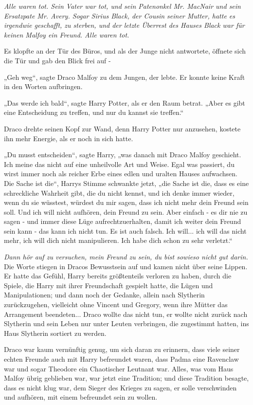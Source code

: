 {\emph{Alle waren tot. Sein Vater war tot, und sein Patenonkel Mr. MacNair und sein Ersatzpate Mr. Avery. Sogar Sirius Black, der Cousin seiner Mutter, hatte es irgendwie geschafft, zu sterben, und der letzte Überrest des Hauses Black war für keinen Malfoy ein Freund. Alle waren tot.}

Es klopfte an der Tür des Büros, und als der Junge nicht antwortete, öffnete sich die Tür und gab den Blick frei auf -

„Geh weg“, sagte Draco Malfoy zu dem Jungen, der lebte. Er konnte keine Kraft in den Worten aufbringen.

„Das werde ich bald“, sagte Harry Potter, als er den Raum betrat. „Aber es gibt eine Entscheidung zu treffen, und nur du kannst sie treffen.“

Draco drehte seinen Kopf zur Wand, denn Harry Potter nur anzusehen, kostete ihn mehr Energie, als er noch in sich hatte.

„Du musst entscheiden“, sagte Harry, „was danach mit Draco Malfoy geschieht. Ich meine das nicht auf eine unheilvolle Art und Weise. Egal was passiert, du wirst immer noch als reicher Erbe eines edlen und uralten Hauses aufwachsen. Die Sache ist die“, Harrys Stimme schwankte jetzt, „die Sache ist die, dass es eine schreckliche Wahrheit gibt, die du nicht kennst, und ich denke immer wieder, wenn du sie wüsstest, würdest du mir sagen, dass ich nicht mehr dein Freund sein soll. Und ich will nicht aufhören, dein Freund zu sein. Aber einfach - es dir nie zu sagen - und immer diese Lüge aufrechtzuerhalten, damit ich weiter dein Freund sein kann - das kann ich nicht tun. Es ist auch falsch. Ich will... ich will das nicht mehr, ich will dich nicht manipulieren. Ich habe dich schon zu sehr verletzt.“

\emph{Dann hör auf zu versuchen, mein Freund zu sein, du bist sowieso nicht gut darin.}\\ Die Worte stiegen in Dracos Bewusstsein auf und kamen nicht über seine Lippen. Er hatte das Gefühl, Harry bereits größtenteils verloren zu haben, durch die Spiele, die Harry mit ihrer Freundschaft gespielt hatte, die Lügen und Manipulationen; und dann noch der Gedanke, allein nach Slytherin zurückzugehen, vielleicht ohne Vincent und Gregory, wenn ihre Mütter das Arrangement beendeten... Draco wollte das nicht tun, er wollte nicht zurück nach Slytherin und sein Leben nur unter Leuten verbringen, die zugestimmt hatten, ins Haus Slytherin sortiert zu werden.

Draco war kaum vernünftig genug, um sich daran zu erinnern, dass viele seiner echten Freunde auch mit Harry befreundet waren, dass Padma eine Ravenclaw war und sogar Theodore ein Chaotischer Leutnant war. Alles, was vom Haus Malfoy übrig geblieben war, war jetzt eine Tradition; und diese Tradition besagte, dass es nicht klug war, dem Sieger des Krieges zu sagen, er solle verschwinden und aufhören, mit einem befreundet sein zu wollen.

}
